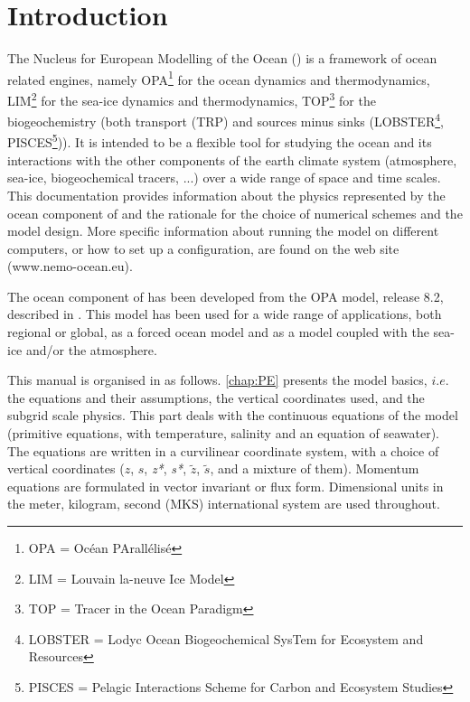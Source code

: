 \documentclass[../tex_main/NEMO_manual]{subfiles}
\begin{document}

\chapter{Introduction}

The Nucleus for European Modelling of the Ocean (\NEMO) is a framework of ocean related engines,
namely OPA\footnote{OPA = Oc\'{e}an PArall\'{e}lis\'{e}} for the ocean dynamics and thermodynamics,
LIM\footnote{LIM = Louvain la-neuve Ice Model} for the sea-ice dynamics and thermodynamics,
TOP\footnote{TOP = Tracer in the Ocean Paradigm} for the biogeochemistry (both transport (TRP) and sources 
minus sinks (LOBSTER\footnote{LOBSTER = Lodyc Ocean Biogeochemical SysTem for Ecosystem and Resources},
PISCES\footnote{PISCES = Pelagic Interactions Scheme for Carbon and Ecosystem Studies})).
It is intended to be a flexible tool for studying the ocean and its interactions with the other components of
the earth climate system (atmosphere, sea-ice, biogeochemical tracers, ...) over
a wide range of space and time scales. 
This documentation provides information about the physics represented by the ocean component of \NEMO and
the rationale for the choice of numerical schemes and the model design.
More specific information about running the model on different computers, or how to set up a configuration,
are found on the \NEMO web site (www.nemo-ocean.eu). 

The ocean component of \NEMO has been developed from the OPA model, release 8.2, described in \citet{Madec1998}.
This model has been used for a wide range of applications, both regional or global,
as a forced ocean model and as a model coupled with the sea-ice and/or the atmosphere.  

This manual is organised in as follows.
\autoref{chap:PE} presents the model basics, $i.e.$ the equations and their assumptions,
the vertical coordinates used, and the subgrid scale physics.
This part deals with the continuous equations of the model
(primitive equations, with temperature, salinity and an equation of seawater).
The equations are written in a curvilinear coordinate system, with a choice of vertical coordinates
($z$, $s$, \textit{z*}, \textit{s*}, $\tilde{z}$, $\tilde{s}$, and a mixture of them).
Momentum equations are formulated in vector invariant or flux form.
Dimensional units in the meter, kilogram, second (MKS) international system are used throughout.
\end{document}
